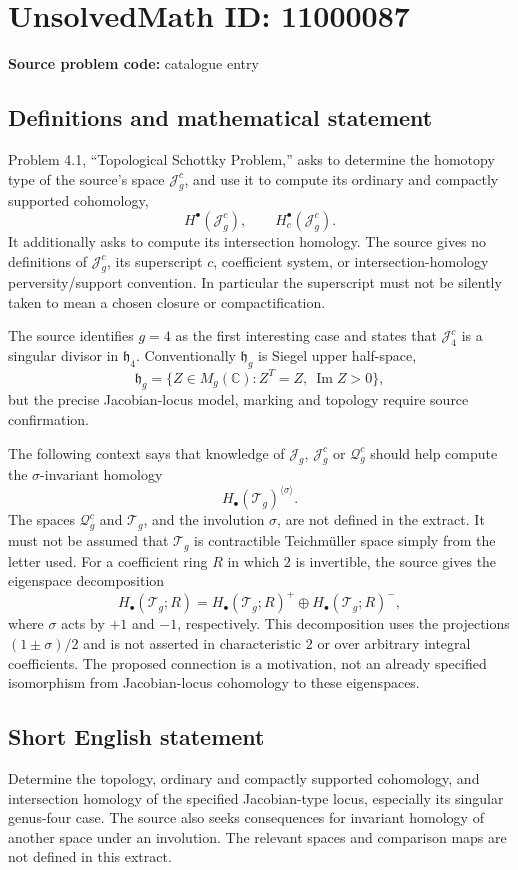 \documentclass[11pt]{article}
\newcommand{\C}{\mathbb{C}}
\begin{document}
\section*{UnsolvedMath ID: 11000087}
\textbf{Source problem code:} catalogue entry
\subsection{Definitions and mathematical statement}
Problem 4.1, ``Topological Schottky Problem,'' asks to determine the homotopy type of the source's space \(\mathcal J_g^c\), and use it to compute its ordinary and compactly supported cohomology,
\[
 H^\bullet(\mathcal J_g^c),\qquad H_c^\bullet(\mathcal J_g^c).
\]
It additionally asks to compute its intersection homology. The source gives no definitions of \(\mathcal J_g^c\), its superscript \(c\), coefficient system, or intersection-homology perversity/support convention. In particular the superscript must not be silently taken to mean a chosen closure or compactification.

The source identifies \(g=4\) as the first interesting case and states that \(\mathcal J_4^c\) is a singular divisor in \(\mathfrak h_4\). Conventionally \(\mathfrak h_g\) is Siegel upper half-space,
\[
 \mathfrak h_g=\{Z\in M_g(\C):Z^T=Z,\ \operatorname{Im}Z>0\},
\]
but the precise Jacobian-locus model, marking and topology require source confirmation.

The following context says that knowledge of \(\mathcal J_g\), \(\mathcal J_g^c\) or \(\mathcal Q_g^c\) should help compute the \(\sigma\)-invariant homology
\[
 H_\bullet(\mathcal T_g)^{\langle\sigma\rangle}.
\]
The spaces \(\mathcal Q_g^c\) and \(\mathcal T_g\), and the involution \(\sigma\), are not defined in the extract. It must not be assumed that \(\mathcal T_g\) is contractible Teichmüller space simply from the letter used. For a coefficient ring \(R\) in which \(2\) is invertible, the source gives the eigenspace decomposition
\[
 H_\bullet(\mathcal T_g;R)
 =H_\bullet(\mathcal T_g;R)^+\oplus H_\bullet(\mathcal T_g;R)^-,
\]
where \(\sigma\) acts by \(+1\) and \(-1\), respectively. This decomposition uses the projections \((1\pm\sigma)/2\) and is not asserted in characteristic \(2\) or over arbitrary integral coefficients. The proposed connection is a motivation, not an already specified isomorphism from Jacobian-locus cohomology to these eigenspaces.
\subsection{Short English statement}
Determine the topology, ordinary and compactly supported cohomology, and intersection homology of the specified Jacobian-type locus, especially its singular genus-four case. The source also seeks consequences for invariant homology of another space under an involution. The relevant spaces and comparison maps are not defined in this extract.
\end{document}
